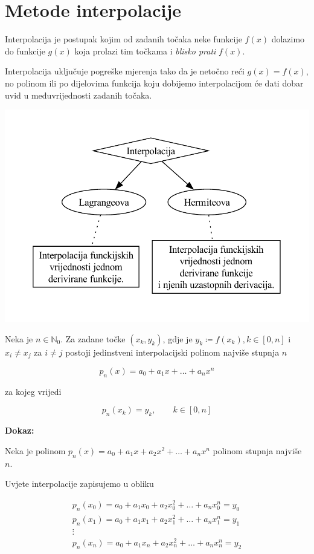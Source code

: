 \section{Metode interpolacije}

Interpolacija je postupak kojim od zadanih točaka neke funkcije $f(x)$ dolazimo
do funkcije $g(x)$ koja prolazi tim točkama i \textit{blisko prati} $f(x)$.

Interpolacija uključuje pogreške mjerenja tako da je netočno reći $g(x) = f(x)$,
no polinom ili po dijelovima funkcija koju dobijemo interpolacijom će dati
dobar uvid u međuvrijednosti zadanih točaka.

\begin{center}
    \includegraphics[width=0.5\linewidth]{interpolation.pdf}
\end{center}

\begin{theorembox}
    Neka je $n\in\mathbb{N}_0$. Za zadane točke $(x_k,y_k)$, gdje je $y_k\coloneq f(x_k), k\in[0,n]$ i $x_i\neq x_j$ za $i\neq j$ postoji jedinstveni interpolacijski polinom najviše stupnja $n$

    $$
        p_n(x)=a_0+a_1x+\dots+a_nx^n
    $$

    za kojeg vrijedi

    $$
        p_n(x_k) = y_k,\qquad k\in[0,n]
    $$
\end{theorembox}

\textbf{Dokaz:}

\bigskip

Neka je polinom $p_n(x)=a_0+a_1x+a_2x^2+\dots+a_nx^n$ polinom stupnja najviše $n$.

Uvjete interpolacije zapisujemo u obliku

\begin{gather*}
    p_n(x_0)=a_0+a_1x_0+a_2x_0^2+\dots+a_nx_0^n=y_0\\
    p_n(x_1)=a_0+a_1x_1+a_2x_1^2+\dots+a_nx_1^n=y_1\\
    \vdots\\
    p_n(x_n)=a_0+a_1x_n+a_2x_n^2+\dots+a_nx_n^n=y_2
\end{gather*}


